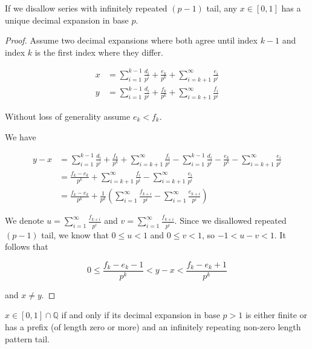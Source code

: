 \begin{thm}\label{while_a_decimal_expansion_four}
If we disallow series with infinitely repeated $(p-1)$ tail, any $x \in [0, 1]$ has a unique decimal expansion in base $p$.
\end{thm}

\begin{proof}
Assume two decimal expansions where both agree until index $k-1$ and index $k$ is the first index where they differ.

\begin{align*}
x &= \sum_{i = 1}^{k-1} \frac{d_i}{p^i} + \frac{e_k}{p^k} + \sum_{i = k + 1}^\infty \frac{e_i}{p^i} \\
y &= \sum_{i = 1}^{k-1} \frac{d_i}{p^i} + \frac{f_k}{p^k} + \sum_{i = k + 1}^\infty \frac{f_i}{p^i}
\end{align*}

Without loss of generality assume $e_k < f_k$. 

We have

\begin{align*}
y - x &= \sum_{i = 1}^{k-1} \frac{d_i}{p^i} + \frac{f_k}{p^k} + \sum_{i = k + 1}^\infty \frac{f_i}{p^i} - \sum_{i = 1}^{k-1} \frac{d_i}{p^i} - \frac{e_k}{p^k} - \sum_{i = k + 1}^\infty \frac{e_i}{p^i} \\
      &= \frac{f_k - e_k}{p^k} + \sum_{i = k + 1}^\infty \frac{f_i}{p^i} - \sum_{i = k + 1}^\infty \frac{e_i}{p^i} \\
      &= \frac{f_k - e_k}{p^k} + \frac{1}{p^k} (\sum_{i = 1}^\infty \frac{f_{k+i}}{p^i} - \sum_{i = 1}^\infty \frac{e_{k+i}}{p^i})
\end{align*}

We denote $u = \sum_{i = 1}^\infty \frac{f_{k+i}}{p^i}$ and $v = \sum_{i = 1}^\infty \frac{f_{k+i}}{p^i}$. Since we disallowed repeated $(p-1)$ tail, we know that $0 \leq u < 1$ and $0 \leq v < 1$, so $-1 < u - v < 1$. It follows that

$$
0 \leq \frac{f_k - e_k - 1}{p^k} < y - x < \frac{f_k - e_k + 1}{p^k}
$$

and $x \neq y$.
\end{proof}

\begin{thm}\label{while_a_decimal_expansion_five}
$x \in [0, 1] \cap \mathbb{Q}$ if and only if its decimal expansion in base $p > 1$ is either finite or has a prefix (of length zero or more) and an infinitely repeating non-zero length pattern tail.
\end{thm}

